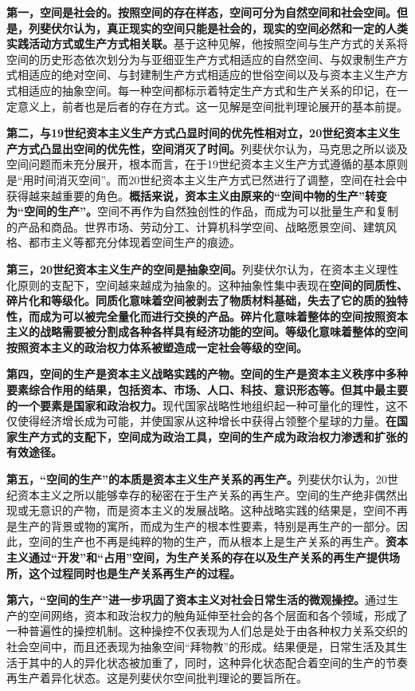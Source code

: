 \documentclass[UTF8, fontset = sourcesans, a4paper, oneside, zihao =
-4, scheme=chinese, no-math, space=true]{ctexbook}
\begin{document}
\textbf{第一，空间是社会的。按照空间的存在样态，空间可分为自然空间和社会空间。但是，列斐伏尔认为，真正现实的空间只能是社会的，现实的空间必然和一定的人类实践活动方式或生产方式相关联。}基于这种见解，他按照空间与生产方式的关系将空间的历史形态依次划分为与亚细亚生产方式相适应的自然空间、与奴隶制生产方式相适应的绝对空间、与封建制生产方式相适应的世俗空间以及与资本主义生产方式相适应的抽象空间。每一种空间都标示着特定生产方式和生产关系的印记，在一定意义上，前者也是后者的存在方式。这一见解是空间批判理论展开的基本前提。

\textbf{第二，与19世纪资本主义生产方式凸显时间的优先性相对立，20世纪资本主义生产方式凸显出空间的优先性，空间消灭了时间。}列斐伏尔认为，马克思之所以谈及空间问题而未充分展开，根本而言，在于19世纪资本主义生产方式遵循的基本原则是``用时间消灭空间''。而20世纪资本主义生产方式已然进行了调整，空间在社会中获得越来越重要的角色。\textbf{概括来说，资本主义由原来的``空间中物的生产''转变为``空间的生产''。}空间不再作为自然独创性的作品，而成为可以批量生产和复制的产品和商品。世界市场、劳动分工、计算机科学空间、战略愿景空间、建筑风格、都市主义等都充分体现着空间生产的痕迹。

\textbf{第三，20世纪资本主义生产的空间是抽象空间。}列斐伏尔认为，在资本主义理性化原则的支配下，空间越来越成为抽象的。这种抽象性集中表现在\textbf{空间的同质性、碎片化和等级化。同质化意味着空间被剥去了物质材料基础，失去了它的质的独特性，而成为可以被完全量化而进行交换的产品。碎片化意味着整体的空间按照资本主义的战略需要被分割成各种各样具有经济功能的空间。等级化意味着整体的空间按照资本主义的政治权力体系被塑造成一定社会等级的空间。}

\textbf{第四，空间的生产是资本主义战略实践的产物。空间的生产是资本主义秩序中多种要素综合作用的结果，包括资本、市场、人口、科技、意识形态等。但其中最主要的一个要素是国家和政治权力。}现代国家战略性地组织起一种可量化的理性，这不仅使得经济增长成为可能，并使国家从这种增长中获得占领整个星球的力量。\textbf{在国家生产方式的支配下，空间成为政治工具，空间的生产成为政治权力渗透和扩张的有效途径。}

\textbf{第五，``空间的生产''的本质是资本主义生产关系的再生产。}列斐伏尔认为，20世纪资本主义之所以能够幸存的秘密在于生产关系的再生产。空间的生产绝非偶然出现或无意识的产物，而是资本主义的发展战略。这种战略实践的结果是，空间不再是生产的背景或物的寓所，而成为生产的根本性要素，特别是再生产的一部分。因此，空间的生产也不再是纯粹的物的生产，而从根本上是生产关系的再生产。\textbf{资本主义通过``开发''和``占用''空间，为生产关系的存在以及生产关系的再生产提供场所，这个过程同时也是生产关系再生产的过程。}

\textbf{第六，``空间的生产''进一步巩固了资本主义对社会日常生活的微观操控。}通过生产的空间网络，资本和政治权力的触角延伸至社会的各个层面和各个领域，形成了一种普遍性的操控机制。这种操控不仅表现为人们总是处于由各种权力关系交织的社会空间中，而且还表现为抽象空间``拜物教''的形成。结果便是，日常生活及其生活于其中的人的异化状态被加重了，同时，这种异化状态配合着空间的生产的节奏再生产着异化状态。这是列斐伏尔空间批判理论的要旨所在。
\end{document}
